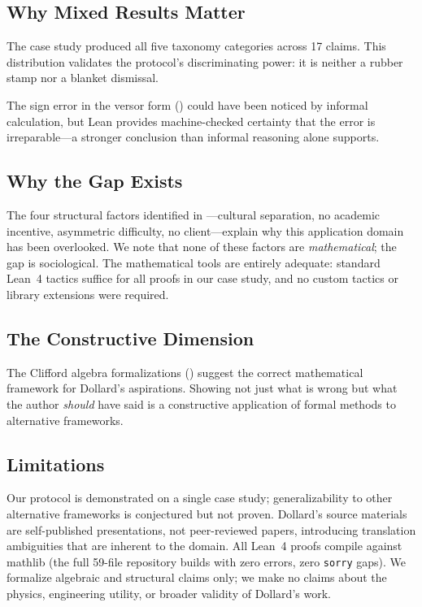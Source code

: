 \documentclass[runningheads]{llncs}
\begin{document}
\subsection{Why Mixed Results Matter}

The case study produced all five taxonomy categories across 17 claims. This
distribution validates the protocol's discriminating power: it is neither
a rubber stamp nor a blanket dismissal.

The sign error in the versor form () could have been
noticed by informal calculation, but Lean provides machine-checked
certainty that the error is irreparable---a stronger conclusion than
informal reasoning alone supports.

\subsection{Why the Gap Exists}

The four structural factors identified in ---cultural
separation, no academic incentive, asymmetric difficulty, no client---explain
why this application domain has been overlooked. We note that none of these
factors are \emph{mathematical}; the gap is sociological. The mathematical
tools are entirely adequate: standard Lean~4 tactics suffice for all proofs in
our case study, and no custom tactics or library extensions were required.

\subsection{The Constructive Dimension}

The Clifford algebra formalizations () suggest the
correct mathematical framework for Dollard's aspirations.
Showing not just what is wrong but what the author \emph{should} have
said is a constructive application of formal methods to
alternative frameworks.

\subsection{Limitations}

Our protocol is demonstrated on a single case study; generalizability to other
alternative frameworks is conjectured but not proven. Dollard's source materials
are self-published presentations, not peer-reviewed papers, introducing
translation ambiguities that are inherent to the domain. All Lean~4 proofs
compile against mathlib (the full 59-file repository builds with
zero errors, zero \texttt{sorry} gaps). We formalize algebraic and structural
claims only; we make no claims about the physics, engineering utility, or
broader validity of Dollard's work.
\end{document}
